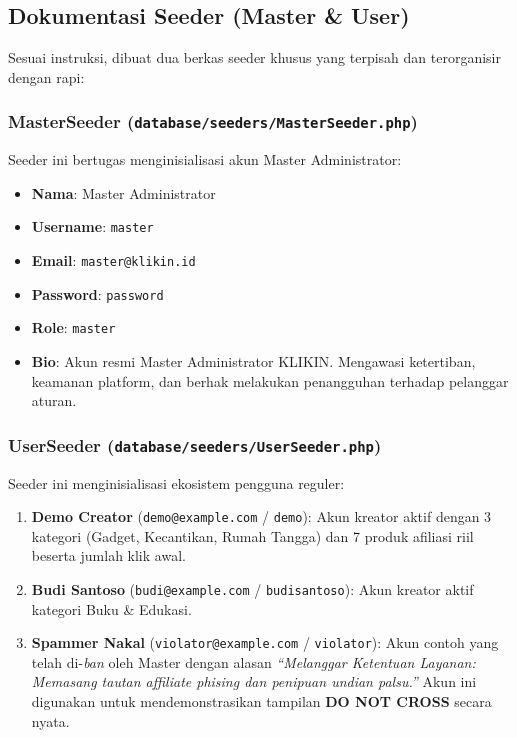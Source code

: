 \documentclass[12pt,a4paper]{article}
\begin{document}
\subsection{Dokumentasi Seeder (Master \& User)}
Sesuai instruksi, dibuat dua berkas seeder khusus yang terpisah dan terorganisir dengan rapi:

\subsubsection{MasterSeeder (\texttt{database/seeders/MasterSeeder.php})}
Seeder ini bertugas menginisialisasi akun Master Administrator:
\begin{itemize}[noitemsep]
    \item \textbf{Nama}: Master Administrator
    \item \textbf{Username}: \texttt{master}
    \item \textbf{Email}: \texttt{master@klikin.id}
    \item \textbf{Password}: \texttt{password}
    \item \textbf{Role}: \texttt{master}
    \item \textbf{Bio}: Akun resmi Master Administrator KLIKIN. Mengawasi ketertiban, keamanan platform, dan berhak melakukan penangguhan terhadap pelanggar aturan.
\end{itemize}

\subsubsection{UserSeeder (\texttt{database/seeders/UserSeeder.php})}
Seeder ini menginisialisasi ekosistem pengguna reguler:
\begin{enumerate}
    \item \textbf{Demo Creator} (\texttt{demo@example.com} / \texttt{demo}): Akun kreator aktif dengan 3 kategori (Gadget, Kecantikan, Rumah Tangga) dan 7 produk afiliasi riil beserta jumlah klik awal.
    \item \textbf{Budi Santoso} (\texttt{budi@example.com} / \texttt{budisantoso}): Akun kreator aktif kategori Buku \& Edukasi.
    \item \textbf{Spammer Nakal} (\texttt{violator@example.com} / \texttt{violator}): Akun contoh yang telah di-\textit{ban} oleh Master dengan alasan \textit{``Melanggar Ketentuan Layanan: Memasang tautan affiliate phising dan penipuan undian palsu.''} Akun ini digunakan untuk mendemonstrasikan tampilan \textbf{DO NOT CROSS} secara nyata.
\end{enumerate}
\end{document}
